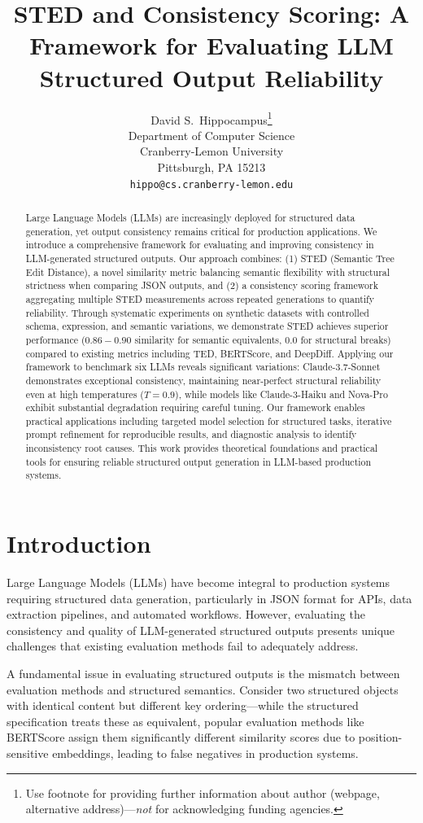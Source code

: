 \documentclass{article}
\title{STED and Consistency Scoring: A Framework for Evaluating LLM Structured Output Reliability}
\author{%
  David S.~Hippocampus\thanks{Use footnote for providing further information
    about author (webpage, alternative address)---\emph{not} for acknowledging
    funding agencies.} \\
  Department of Computer Science\\
  Cranberry-Lemon University\\
  Pittsburgh, PA 15213 \\
  \texttt{hippo@cs.cranberry-lemon.edu} \\
}
\begin{document}
\maketitle


\begin{abstract}
Large Language Models (LLMs) are increasingly deployed for structured data generation, yet output consistency remains critical for production applications. We introduce a comprehensive framework for evaluating and improving consistency in LLM-generated structured outputs. Our approach combines: (1) STED (Semantic Tree Edit Distance), a novel similarity metric balancing semantic flexibility with structural strictness when comparing JSON outputs, and (2) a consistency scoring framework aggregating multiple STED measurements across repeated generations to quantify reliability. Through systematic experiments on synthetic datasets with controlled schema, expression, and semantic variations, we demonstrate STED achieves superior performance ($0.86-0.90$ similarity for semantic equivalents, $0.0$ for structural breaks) compared to existing metrics including TED, BERTScore, and DeepDiff. Applying our framework to benchmark six LLMs reveals significant variations: Claude-3.7-Sonnet demonstrates exceptional consistency, maintaining near-perfect structural reliability even at high temperatures ($T=0.9$), while models like Claude-3-Haiku and Nova-Pro exhibit substantial degradation requiring careful tuning. Our framework enables practical applications including targeted model selection for structured tasks, iterative prompt refinement for reproducible results, and diagnostic analysis to identify inconsistency root causes. This work provides theoretical foundations and practical tools for ensuring reliable structured output generation in LLM-based production systems.
\end{abstract}


\section{Introduction}

Large Language Models (LLMs) have become integral to production systems requiring structured data generation, particularly in JSON format for APIs, data extraction pipelines, and automated workflows. However, evaluating the consistency and quality of LLM-generated structured outputs presents unique challenges that existing evaluation methods fail to adequately address.

A fundamental issue in evaluating structured outputs is the mismatch between evaluation methods and structured semantics. Consider two structured objects with identical content but different key ordering---while the structured specification treats these as equivalent, popular evaluation methods like BERTScore \cite{Zhang2020} assign them significantly different similarity scores due to position-sensitive embeddings, leading to false negatives in production systems.
\end{document}
